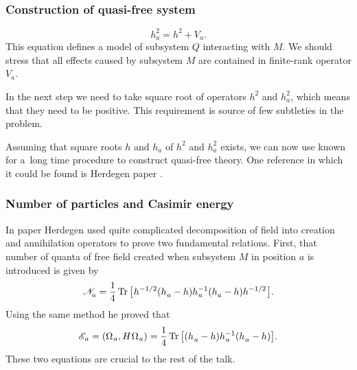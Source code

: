 \documentclass[10pt,t]{beamer}
\begin{document}
\begin{frame}
  \frametitle{Construction of quasi-free system}


  \begin{equation}
    \label{eq:Construction-of-quasi-free-system-ETC-02}
    h_{ a }^{ 2 } = h^{ 2 } + V_{ a }.
  \end{equation}
  This equation defines a model of subsystem $Q$ interacting with $M$.
  We should stress that all effects caused by subsystem $M$ are contained
  in finite-rank operator $V_{ a }$.

  In the next step we need to take square root of operators $h^{ 2 }$
  and $h_{ a }^{ 2 }$, which means that they need to be positive. This
  requirement is source of few subtleties in the problem.

  Assuming that square roots $h$ and $h_{ a }$ of $h^{ 2 }$ and $h_{ a }^{ 2 }$
  exists, we can now use known for a~long time procedure to construct
  quasi-free theory. One reference in which it could be found is Herdegen
  paper \parencite{Herdegen-Quantum-backreaction-ETC-Part-I-Pub-2005}.

\end{frame}





\begin{frame}
  \frametitle{Number of particles and Casimir energy}


  In paper \parencite{Herdegen-Quantum-backreaction-ETC-Part-I-Pub-2005}
  Herdegen used quite complicated decomposition of field into creation
  and annihilation operators to prove two fundamental relations. First, that
  number of quanta of \alert{free} field created when subsystem $M$ in
  position $a$ is introduced is given by
  \begin{equation}
    \label{eq:Construction-of-quasi-free-system-ETC-03}
    \mathcal{N}_{ a }^{ \vphantom{1} } =
    \frac{ 1 }{ 4 } \operatorname{Tr}\big[ \hspace{0.05em} h^{ -1/2 } (
    h_{ \hspace{0.05em} a }^{ \vphantom{1} } - h ) h_{ \hspace{0.05em} a }^{ -1 }
    ( h_{ a }^{ \vphantom{1} } - h ) h^{ -1/2 } \hspace{0.07em} \big].
  \end{equation}
  Using the same method he proved that
  \begin{equation}
    \label{eq:Construction-of-quasi-free-system-ETC-04}
    \mathcal{E}_{ \hspace{0.07em} a } =
    ( \Omega_{ \hspace{0.07em} a }, H \hspace{0.05em} \Omega_{ \hspace{0.07em} a } ) =
    \frac{ 1 }{ 4 }
    \operatorname{Tr}\big[ ( h_{ \hspace{0.05em} a }^{ \vphantom{1} } - h )
    h_{ \hspace{0.05em} a }^{ -1 }
    ( h_{ \hspace{0.05em} a }^{ \vphantom{1} } - h ) \big].
  \end{equation}
  These two equations are crucial to the rest of the talk.

\end{frame}
\end{document}
